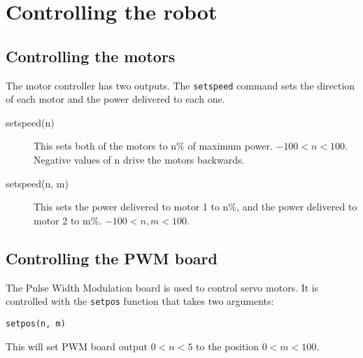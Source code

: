 \documentclass{article}
\begin{document}
\section{Controlling the robot}
\subsection{Controlling the motors}
The motor controller has two outputs.  The \texttt{setspeed} command
sets the direction of each motor and the power delivered to each one.

\begin{description}
\item[setspeed(n)] This sets both of the motors to n\% of maximum
power.  $-100<n<100$. Negative values of n drive the motors backwards.
\item[setspeed(n, m)] This sets the power delivered to motor 1 to n\%,
  and the power delivered to motor 2 to m\%. $-100<n,m<100$.
\end{description}

\subsection{Controlling the PWM board}
The Pulse Width Modulation board is used to control servo motors.  It is
controlled with the \texttt{setpos} function that takes two arguments:

\begin{verbatim}
setpos(n, m)
\end{verbatim}

This will set PWM board output $0<n<5$ to the position $0<m<100$.
\end{document}
